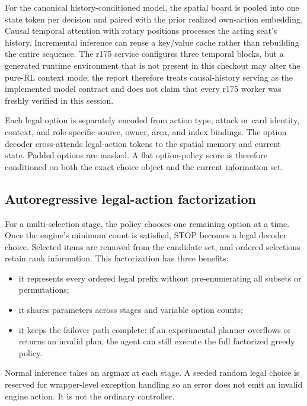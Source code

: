 \documentclass[10pt]{article}
\begin{document}
For the canonical history-conditioned model, the spatial board is pooled into one state token per decision and paired with the prior realized own-action embedding. Causal temporal attention with rotary positions processes the acting seat's history. Incremental inference can reuse a key/value cache rather than rebuilding the entire sequence. The r175 service configures three temporal blocks, but a generated runtime environment that is not present in this checkout may alter the pure-RL context mode; the report therefore treats causal-history serving as the implemented model contract and does not claim that every r175 worker was freshly verified in this session.

Each legal option is separately encoded from action type, attack or card identity, context, and role-specific source, owner, area, and index bindings. The option decoder cross-attends legal-action tokens to the spatial memory and current state. Padded options are masked. A flat option-policy score is therefore conditioned on both the exact choice object and the current information set.

\subsection{Autoregressive legal-action factorization}

For a multi-selection stage, the policy chooses one remaining option at a time. Once the engine's minimum count is satisfied, STOP becomes a legal decoder choice. Selected items are removed from the candidate set, and ordered selections retain rank information. This factorization has three benefits:

\begin{itemize}
\item it represents every ordered legal prefix without pre-enumerating all subsets or permutations;
\item it shares parameters across stages and variable option counts;
\item it keeps the failover path complete: if an experimental planner overflows or returns an invalid plan, the agent can still execute the full factorized greedy policy.
\end{itemize}

Normal inference takes an argmax at each stage. A seeded random legal choice is reserved for wrapper-level exception handling so an error does not emit an invalid engine action. It is not the ordinary controller.
\end{document}
